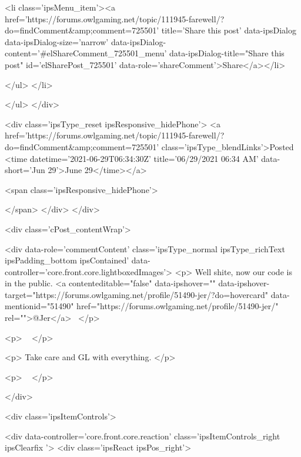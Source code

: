 						
							<li class='ipsMenu_item'><a href='https://forums.owlgaming.net/topic/111945-farewell/?do=findComment&amp;comment=725501' title='Share this post' data-ipsDialog data-ipsDialog-size='narrow' data-ipsDialog-content='#elShareComment_725501_menu' data-ipsDialog-title="Share this post" id='elSharePost_725501' data-role='shareComment'>Share</a></li>
						
                        
						
						
						
							
								
							
							
							
							
							
							
						
					</ul>
				</li>
				
			</ul>
		</div>

		<div class='ipsType_reset ipsResponsive_hidePhone'>
			<a href='https://forums.owlgaming.net/topic/111945-farewell/?do=findComment&amp;comment=725501' class='ipsType_blendLinks'>Posted <time datetime='2021-06-29T06:34:30Z' title='06/29/2021 06:34  AM' data-short='Jun 29'>June 29</time></a> 
			
			<span class='ipsResponsive_hidePhone'>
				
				
			</span>
		</div>
	</div>

	

    

	<div class='cPost_contentWrap'>
		
		<div data-role='commentContent' class='ipsType_normal ipsType_richText ipsPadding_bottom ipsContained' data-controller='core.front.core.lightboxedImages'>
			<p>
	Well shite, now our code is in the public. <a contenteditable="false" data-ipshover="" data-ipshover-target="https://forums.owlgaming.net/profile/51490-jer/?do=hovercard" data-mentionid="51490" href="https://forums.owlgaming.net/profile/51490-jer/" rel="">@Jer</a> 
</p>

<p>
	 
</p>

<p>
	Take care and GL with everything.
</p>

<p>
	 
</p>


			
		</div>

		
			<div class='ipsItemControls'>
				
					
						

	<div data-controller='core.front.core.reaction' class='ipsItemControls_right ipsClearfix '>	
		<div class='ipsReact ipsPos_right'>
			
